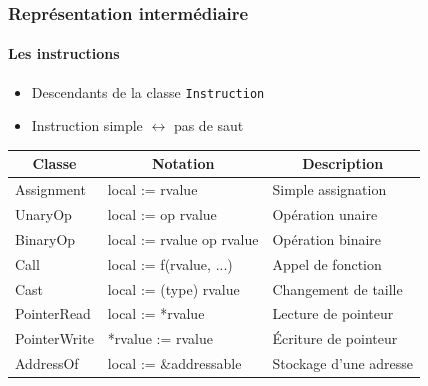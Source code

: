 \documentclass{beamer}
\newcommand*{\thead}[1]{\multicolumn{1}{|c|}{\bfseries #1}}
\begin{document}
\begin{frame}
    \frametitle{Représentation intermédiaire}
    \framesubtitle{Les instructions}
    \begin{itemize}
        \item Descendants de la classe \lstinline{Instruction}
        \item Instruction simple $\leftrightarrow$ pas de saut
    \end{itemize}
    \pause
    \begin{center}
        \begin{tabular}{ | l | l | l | }
        \hline
        \thead{Classe} & \thead{Notation} & \thead{Description} \\
        \hline 
        Assignment & local := rvalue & Simple assignation \pause \\ 
        \hline 
        UnaryOp & local := op rvalue & Opération unaire \pause \\
        \hline
        BinaryOp & local := rvalue op rvalue & Opération binaire \pause \\
        \hline
        Call & local := f(rvalue, ...) & Appel de fonction \pause \\
        \hline
        Cast & local := (type) rvalue & Changement de taille \pause \\
        \hline
        PointerRead & local := *rvalue & Lecture de pointeur \pause \\
        \hline
        PointerWrite & *rvalue := rvalue & Écriture de pointeur \pause \\
        \hline
        AddressOf & local := \&addressable & Stockage d'une adresse\\
        \hline
        \end{tabular}
    \end{center}
\end{frame}
\end{document}
